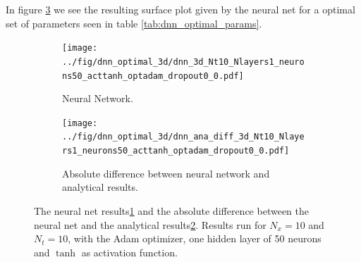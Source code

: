 In figure \ref{fig:3d-dnn-comparison-plots} we see the resulting surface plot given by the neural net for a optimal set of parameters seen in table \ref{tab:dnn_optimal_params}.
\begin{figure}[h!tb]
    \centering
    \begin{subfigure}{0.5\textwidth}
        \centering
        \texttt{[image: ../fig/dnn\_optimal\_3d/dnn\_3d\_Nt10\_Nlayers1\_neurons50\_acttanh\_optadam\_dropout0\_0.pdf]}
        \caption{Neural Network.}
        \label{fig:neural-net-optimal-3d}
    \end{subfigure} \qquad \qquad \qquad
    \begin{subfigure}{0.5\textwidth}
        \centering
        \texttt{[image: ../fig/dnn\_optimal\_3d/dnn\_ana\_diff\_3d\_Nt10\_Nlayers1\_neurons50\_acttanh\_optadam\_dropout0\_0.pdf]}
        \caption{Absolute difference between neural network and analytical results.}
        \label{fig:dnn-ana-diff-3d}
    \end{subfigure}
    \caption{The neural net results\ref{fig:neural-net-optimal-3d} and the absolute difference between the neural net and the analytical results\ref{fig:dnn-ana-diff-3d}. Results run for $N_x=10$ and $N_t=10$, with the Adam optimizer, one hidden layer of 50 neurons and $\tanh$ as activation function.}
    \label{fig:3d-dnn-comparison-plots}
\end{figure}



